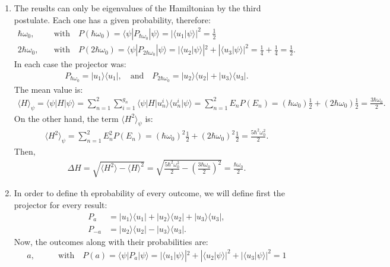 \documentclass[letterpaper,11pt,twoside]{article}
\newcommand{\ket}[1]{|#1\rangle}
\newcommand{\bra}[1]{\langle#1|}
\newcommand{\braket}[1]{\langle#1\rangle}
\begin{document}
\begin{enumerate}[itemsep=0pt,topsep=0pt,label=\alph*.]
  \item The reuslts can only be eigenvalues of the Hamiltonian by the third postulate. Each one has a given probability, therefore:
  \begin{align*}
    \hbar\omega_0,&\quad\text{with}\quad P(\hbar\omega_0)=\braket{\psi|P_{\hbar\omega_0}|\psi}=|\braket{u_1|\psi}|^2=\frac{1}{2}\\
    2\hbar\omega_0,&\quad\text{with}\quad P(2\hbar\omega_0)=\braket{\psi|P_{2\hbar\omega_0}|\psi}=|\braket{u_2|\psi}|^2+|\braket{u_3|\psi}|^2=\frac{1}{4}+\frac{1}{4}=\frac{1}{2}.
  \end{align*}
  In each case the projector was:
  \begin{align*}
    P_{\hbar\omega_0}=\ket{u_1}\bra{u_1},\quad\text{and}\quad P_{2\hbar\omega_0}=\ket{u_2}\bra{u_2}+\ket{u_3}\bra{u_3}.
  \end{align*}
  The mean value is:
  \begin{align*}
    \braket{H}_\psi=\braket{\psi|H|\psi}=\sum_{n=1}^2\sum_{i=1}^{g_n}\braket{\psi|H|u_n^i}\braket{u_n^i|\psi}=\sum_{n=1}^2E_nP(E_n)=(\hbar\omega_0)\frac{1}{2}+(2\hbar\omega_0)\frac{1}{2}=\frac{3\hbar\omega_0}{2}.
  \end{align*}
  On the other hand, the term $\braket{H^2}_\psi$ is:
  \begin{align*}
    \braket{H^2}_\psi=\sum_{n=1}^2E_n^2P(E_n)=(\hbar\omega_0)^2\frac{1}{2}+(2\hbar\omega_0)^2\frac{1}{2}=\frac{5\hbar^2\omega_0^2}{2}.
  \end{align*}
  Then,
  \begin{align*}
    \Delta H=\sqrt{\braket{H^2}-\braket{H}^2}=\sqrt{\frac{5\hbar^2\omega_0^2}{2}-\left(\frac{3\hbar\omega_0}{2}\right)^2}=\frac{\hbar\omega_0}{2}.
  \end{align*}
  \item In order to define th eprobability of every outcome, we will define first the projector for every result:
  \begin{align*}
    P_a&=\ket{u_1}\bra{u_1}+\ket{u_2}\bra{u_2}+\ket{u_3}\bra{u_3},\\
    P_{-a}&=\ket{u_2}\bra{u_2}-\ket{u_3}\bra{u_3}.
  \end{align*}
  Now, the outcomes along with their probabilities are:
  \begin{align*}
    a,&\qquad\text{with}\quad P(a)=\braket{\psi|P_a|\psi}=|\braket{u_1|\psi}|^2+|\braket{u_2|\psi}|^2+|\braket{u_3|\psi}|^2=1\\

\end{align*}
\end{enumerate}
\end{document}

